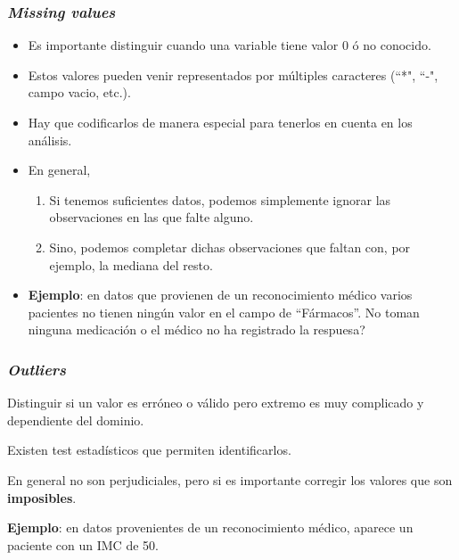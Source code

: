 \documentclass{beamer}
\newenvironment{wideitemize}{\itemize\addtolength{\itemsep}{12pt}}{\enditemize}
\begin{document}
\begin{frame}
\frametitle{\textit{Missing values}}

\begin{itemize}
\item Es importante distinguir cuando una variable tiene valor $0$ ó no conocido.
\item Estos valores pueden venir representados por múltiples caracteres (``*", ``-", campo vacio, etc.).
\item Hay que codificarlos de manera especial para tenerlos en cuenta en los análisis.
\item En general,
\begin{enumerate}
\item Si tenemos suficientes datos, podemos simplemente ignorar las observaciones en las que falte alguno.
\item Sino, podemos completar dichas observaciones que faltan con, por ejemplo, la mediana del resto.
\end{enumerate}
\item \textbf{Ejemplo}: en datos que provienen de un reconocimiento médico varios pacientes no tienen ningún valor en el campo de ``Fármacos''. No toman ninguna medicación o el médico no ha registrado la respuesa?
\end{itemize}
\end{frame}

\begin{frame}
\frametitle{\textit{Outliers}}
\begin{wideitemize}
\item Distinguir si un valor es erróneo o válido pero extremo es muy complicado y dependiente del dominio.
\item Existen test estadísticos que permiten identificarlos.
\item En general no son perjudiciales, pero si es importante corregir los valores que son \textbf{imposibles}.
\item \textbf{Ejemplo}: en datos provenientes de un reconocimiento médico, aparece un paciente con un IMC de 50.
\end{wideitemize}
\end{frame}
\end{document}

